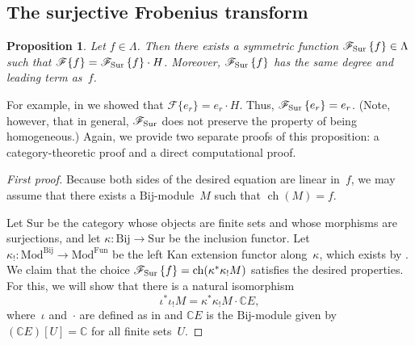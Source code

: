 \documentclass[11pt]{article}
\newtheorem{prop}[theo]{Proposition}
\theoremstyle{definition}
\numberwithin{equation}{section}
\newcommand{\K}{\mathbb{C}}
\newcommand{\Mod}{\mathrm{Mod}}
\newcommand{\Fa}{\mathscr{F}}
\newcommand{\Sur}{\mathchoice{\operatorname{Sur}}{\operatorname{Sur}}{\mathrm{Sur}}{\mathrm{Sur}}}
\newcommand{\rmSur}{\mathrm{Sur}}
\newcommand{\rmBij}{\mathrm{Bij}}
\newcommand{\rmFun}{\mathrm{Fun}}
\newcommand{\F}[1]{\mathscr{F}\{#1\}}
\newcommand{\FSur}[1]{\mathscr{F}_{\Sur}\left\{#1\right\}}
\DeclareMathOperator{\ch}{ch}
\begin{document}
\subsection{The surjective Frobenius transform}
\begin{prop}
\label{proposition:fsur}
Let $f \in \Lambda$. Then there exists a symmetric function $\FSur{f} \in \Lambda$ such that $\F{f} = \FSur{f} \cdot H$. Moreover, $\FSur{f}$ has the same degree and leading term as~$f$.
\end{prop}
For example, in  we showed that $\F{e_r} = e_r \cdot H$. Thus, $\FSur{e_r} = e_r$. (Note, however, that in general, $\Fa_{\Sur}$ does not preserve the property of being homogeneous.) Again, we provide two separate proofs of this proposition: a category-theoretic proof and a direct computational proof.
\begin{proof}[First proof]
Because both sides of the desired equation are linear in~$f$, we may assume that there exists a $\rmBij$-module~$M$ such that $\ch(M) = f$.

Let $\rmSur$ be the category whose objects are finite sets and whose morphisms are surjections, and let $\kappa \colon \rmBij \to \rmSur$ be the inclusion functor. Let $\kappa_! \colon \Mod^\rmBij \to \Mod^\rmFun$ be the left Kan extension functor along~$\kappa$, which exists by \cite[Proposition~2.6.7]{MR3641124}. We claim that the choice $\FSur{f} = \ch(\kappa^* \kappa_!M)$ satisfies the desired properties. For this, we will show that there is a natural isomorphism
\begin{equation}\label{eq:iotakappa}
    \iota^* \iota_! M = \kappa^* \kappa_! M \cdot \K E,
\end{equation}
where~$\iota$ and~$\cdot$ are defined as in  and $\K E$ is the $\rmBij$-module given by $(\K E)[U] = \K$ for all finite sets~$U$.


\end{proof}
\end{document}
